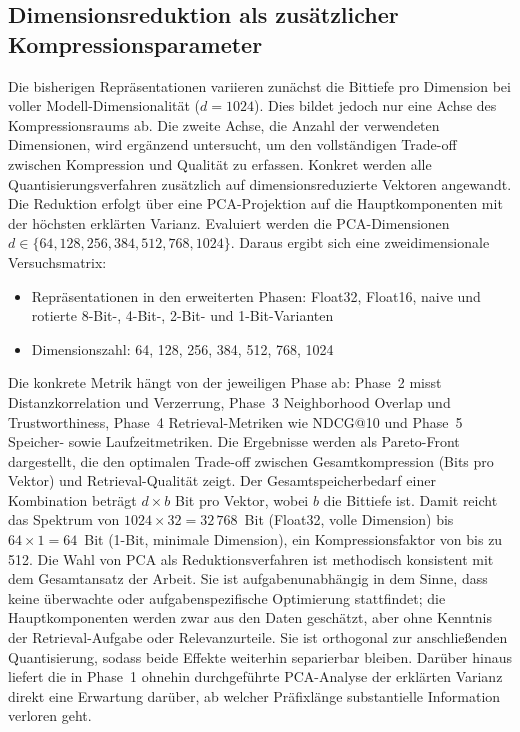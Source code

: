 \subsection{Dimensionsreduktion als zusätzlicher Kompressionsparameter}
\label{sec:methodik_dimreduktion}
%
Die bisherigen Repräsentationen variieren zunächst die Bittiefe pro Dimension bei voller Modell-Dimensionalität ($d = 1024$).
Dies bildet jedoch nur eine Achse des Kompressionsraums ab.
Die zweite Achse, die Anzahl der verwendeten Dimensionen, wird ergänzend untersucht, um den vollständigen Trade-off zwischen Kompression und Qualität zu erfassen.
%
Konkret werden alle Quantisierungsverfahren zusätzlich auf dimensionsreduzierte Vektoren angewandt.
Die Reduktion erfolgt über eine PCA-Projektion auf die Hauptkomponenten mit der höchsten erklärten Varianz.
Evaluiert werden die PCA-Dimensionen $d \in \{64, 128, 256, 384, 512, 768, 1024\}$.
%
Daraus ergibt sich eine zweidimensionale Versuchsmatrix:
\begin{itemize}
  \item Repräsentationen in den erweiterten Phasen: Float32, Float16, naive und rotierte 8-Bit-, 4-Bit-, 2-Bit- und 1-Bit-Varianten
  \item Dimensionszahl: 64, 128, 256, 384, 512, 768, 1024
\end{itemize}
%
Die konkrete Metrik hängt von der jeweiligen Phase ab: Phase~2 misst Distanzkorrelation und Verzerrung, Phase~3 Neighborhood Overlap und Trustworthiness, Phase~4 Retrieval-Metriken wie NDCG@10 und Phase~5 Speicher- sowie Laufzeitmetriken.
Die Ergebnisse werden als Pareto-Front dargestellt, die den optimalen Trade-off zwischen Gesamtkompression (Bits pro Vektor) und Retrieval-Qualität zeigt.
%
Der Gesamtspeicherbedarf einer Kombination beträgt $d \times b$ Bit pro Vektor, wobei $b$ die Bittiefe ist.
Damit reicht das Spektrum von $1024 \times 32 = 32\,768$~Bit (Float32, volle Dimension) bis $64 \times 1 = 64$~Bit (1-Bit, minimale Dimension), ein Kompressionsfaktor von bis zu 512.
%
Die Wahl von PCA als Reduktionsverfahren ist methodisch konsistent mit dem Gesamtansatz der Arbeit.
Sie ist aufgabenunabhängig in dem Sinne, dass keine überwachte oder aufgabenspezifische Optimierung stattfindet; die Hauptkomponenten werden zwar aus den Daten geschätzt, aber ohne Kenntnis der Retrieval-Aufgabe oder Relevanzurteile.
Sie ist orthogonal zur anschließenden Quantisierung, sodass beide Effekte weiterhin separierbar bleiben.
Darüber hinaus liefert die in Phase~1 ohnehin durchgeführte PCA-Analyse der erklärten Varianz direkt eine Erwartung darüber, ab welcher Präfixlänge substantielle Information verloren geht.
%
